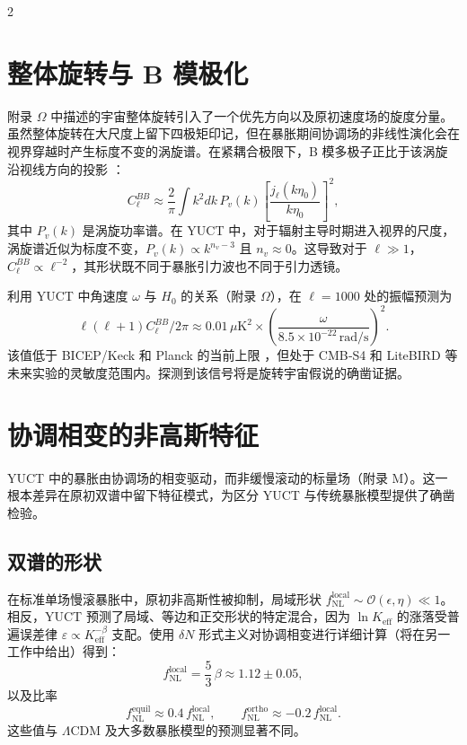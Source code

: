 \documentclass[11pt,a4paper]{article}
\begin{document}
\begin{multicols}{2}
		\section{整体旋转与 B 模极化}
		
		附录 $\Omega$ 中描述的宇宙整体旋转引入了一个优先方向以及原初速度场的旋度分量。虽然整体旋转在大尺度上留下四极矩印记，但在暴胀期间协调场的非线性演化会在视界穿越时产生标度不变的涡旋谱。在紧耦合极限下，B 模多极子正比于该涡旋沿视线方向的投影 \cite{Cooray2005}：
		\begin{equation}
			C_\ell^{BB} \approx \frac{2}{\pi} \int k^2 dk \, P_v(k) \left[ \frac{j_\ell(k\eta_0)}{k\eta_0} \right]^2,
		\end{equation}
		其中 $P_v(k)$ 是涡旋功率谱。在 YUCT 中，对于辐射主导时期进入视界的尺度，涡旋谱近似为标度不变，$P_v(k) \propto k^{n_v-3}$ 且 $n_v \approx 0$。这导致对于 $\ell \gg 1$，$C_\ell^{BB} \propto \ell^{-2}$，其形状既不同于暴胀引力波也不同于引力透镜。
		
		利用 YUCT 中角速度 $\omega$ 与 $H_0$ 的关系（附录 $\Omega$），在 $\ell=1000$ 处的振幅预测为
		\begin{equation}
			\ell(\ell+1)C_\ell^{BB}/2\pi \approx 0.01\,\mu\text{K}^2 \times \left(\frac{\omega}{8.5\times10^{-22}\,\text{rad/s}}\right)^2.
			\label{eq:BB_amplitude}
		\end{equation}
		该值低于 BICEP/Keck 和 Planck 的当前上限 \cite{BICEP2021}，但处于 CMB‑S4 和 LiteBIRD 等未来实验的灵敏度范围内。探测到该信号将是旋转宇宙假说的确凿证据。
		
		\section{协调相变的非高斯特征}
		\label{sec:nongaussian}
		
		YUCT 中的暴胀由协调场的相变驱动，而非缓慢滚动的标量场（附录 M）。这一根本差异在原初双谱中留下特征模式，为区分 YUCT 与传统暴胀模型提供了确凿检验。
		
		\subsection{双谱的形状}
		在标准单场慢滚暴胀中，原初非高斯性被抑制，局域形状 $f_{\mathrm{NL}}^{\mathrm{local}} \sim \mathcal{O}(\epsilon,\eta) \ll 1$。相反，YUCT 预测了局域、等边和正交形状的特定混合，因为 $\ln K_{\mathrm{eff}}$ 的涨落受普遍误差律 $\varepsilon \propto K_{\mathrm{eff}}^{-\beta}$ 支配。使用 $\delta N$ 形式主义对协调相变进行详细计算（将在另一工作中给出）得到：
		\begin{equation}
			f_{\mathrm{NL}}^{\mathrm{local}} = \frac{5}{3}\,\beta \approx 1.12 \pm 0.05,
		\end{equation}
		以及比率
		\begin{equation}
			f_{\mathrm{NL}}^{\mathrm{equil}} \approx 0.4\, f_{\mathrm{NL}}^{\mathrm{local}}, \qquad
			f_{\mathrm{NL}}^{\mathrm{ortho}} \approx -0.2\, f_{\mathrm{NL}}^{\mathrm{local}}.
		\end{equation}
		这些值与 $\Lambda$CDM 及大多数暴胀模型的预测显著不同。
		

\end{multicols}
\end{document}
